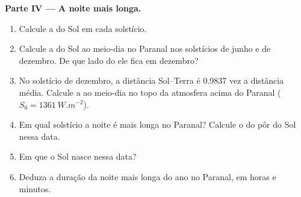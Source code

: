 \begin{problem}
\noindent\textbf{Parte IV --- A noite mais longa.}
\begin{enumerate}[resume]
  \item Calcule a  do Sol em cada solstício.
  \item Calcule a  do Sol ao meio-dia no Paranal nos solstícios de junho e de dezembro. De que lado do  ele fica em dezembro?
  \item No solstício de dezembro, a distância Sol--Terra é 0.9837 vez a distância média. Calcule a  ao meio-dia no topo da atmosfera acima do Paranal ($S_0 = \qty{1361}{W.m^{-2}}$).
  \item Em qual solstício a noite é mais longa no Paranal? Calcule o  do pôr do Sol nessa data.
  \item Em que  o Sol nasce nessa data?
  \item Deduza a duração da noite mais longa do ano no Paranal, em horas e minutos.
\end{enumerate}
\end{problem}
